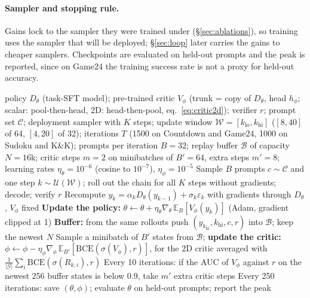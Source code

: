 \paragraph{Sampler and stopping rule.}
Gains lock to the sampler they were trained under (\S\ref{sec:ablations}), so training uses the sampler that will be deployed; \S\ref{sec:loop} later carries the gains to cheaper samplers. Checkpoints are evaluated on held-out prompts and the peak is reported, since on Game24 the training success rate is not a proxy for held-out accuracy.

\begin{algorithm}[t]
\caption{\jpc{}: pathwise RL with a jointly trained critic (scalar or 2D)}
\label{alg:jpc}
\small
\begin{algorithmic}[1]
\REQUIRE policy $D_\theta$ (task-SFT model); pre-trained critic $V_\phi$ (trunk = copy of $D_\theta$, head $h_\phi$; scalar: pool-then-head, 2D: head-then-pool, eq.~\ref{eq:critic2d}); verifier $r$; prompt set $\mathcal C$; deployment sampler with $K$ steps; update window $\mathcal W=[k_{\mathrm{lo}},k_{\mathrm{hi}}]$ ($[8,40]$ of 64, $[4,20]$ of 32); iterations $T$ (1500 on Countdown and Game24, 1000 on Sudoku and K\&K); prompts per iteration $B{=}32$; replay buffer $\mathcal B$ of capacity $N{=}16$k; critic steps $m{=}2$ on minibatches of $B'{=}64$, extra steps $m'{=}8$; learning rates $\eta_\theta{=}10^{-6}$ (cosine to $10^{-7}$), $\eta_\phi{=}10^{-5}$
  \STATE Sample $B$ prompts $c\sim\mathcal C$ and one step $k\sim\mathcal U(\mathcal W)$; roll out the chain for all $K$ steps without gradients; decode; verify $r$
  \STATE Recompute $y_k=\alpha_kD_\theta(y_{k-1})+\sigma_k\varepsilon_k$ with gradients through $D_\theta$, $V_\phi$ fixed
  \STATE \textbf{Update the policy:} $\theta\leftarrow\theta+\eta_\theta\nabla_\theta\,\mathbb E_B[V_\phi(y_k)]$ (Adam, gradient clipped at 1)
  \STATE \textbf{Buffer:} from the same rollouts push $(y_{k_{\mathrm{hi}}},k_{\mathrm{hi}},c,r)$ into $\mathcal B$; keep the newest $N$
    \STATE Sample a minibatch of $B'$ states from $\mathcal B$; \textbf{update the critic:} $\phi\leftarrow\phi-\eta_\phi\nabla_\phi\,\mathbb E_{B'}[\mathrm{BCE}(\sigma(V_\phi),r)]$, for the 2D critic averaged with $\tfrac1{|\mathcal G|}\sum_i\mathrm{BCE}(\sigma(R_{k,i}),r)$
  \ENDFOR
  \STATE Every 10 iterations: if the AUC of $V_\phi$ against $r$ on the newest 256 buffer states is below $0.9$, take $m'$ extra critic steps
  \STATE Every 250 iterations: save $(\theta,\phi)$; evaluate $\theta$ on held-out prompts; report the peak
\ENDFOR
\end{algorithmic}
\end{algorithm}

